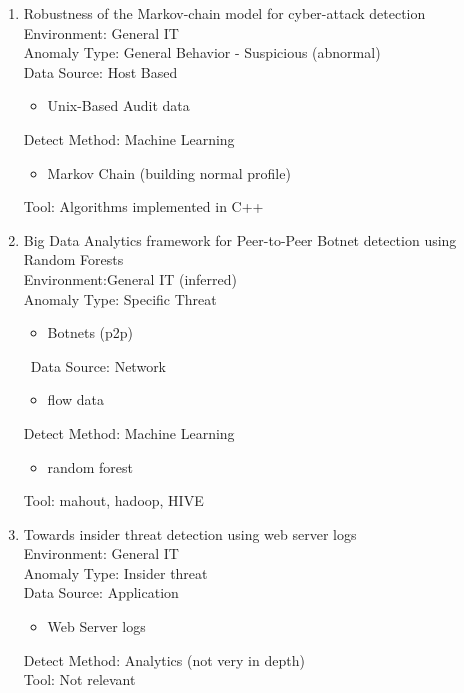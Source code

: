 \begin{enumerate}
    
    \item 
    Robustness of the Markov-chain model for cyber-attack detection\cite{ye2004robustness}\\
    Environment: General IT\\
    Anomaly Type: General Behavior - Suspicious (abnormal) \\
    Data Source: Host Based\\
    \begin{itemize}
        \item Unix-Based Audit data
    \end{itemize}
    Detect Method: Machine Learning \\
    \begin{itemize}
        \item Markov Chain (building normal profile)
    \end{itemize}
    Tool: Algorithms implemented in C++
    
    \item 
    Big Data Analytics framework for Peer-to-Peer Botnet detection using Random Forests\cite{singh2014big}\\
    Environment:General IT (inferred)\\
    Anomaly Type: Specific Threat
    \begin{itemize}
        \item Botnets (p2p)
    \end{itemize}\
    Data Source: Network 
    \begin{itemize}
        \item flow data
    \end{itemize}
    Detect Method: Machine Learning 
    \begin{itemize}
        \item random forest
    \end{itemize}
    Tool: mahout, hadoop, HIVE 
    
    \item 
    Towards insider threat detection using web server logs\cite{myers2009towards}\\
    Environment: General IT \\
    Anomaly Type: Insider threat \\
    Data Source: Application
    \begin{itemize}
        \item Web Server logs
    \end{itemize}
    Detect Method: Analytics (not very in depth)\\ 
    Tool: Not relevant
    

\end{enumerate}
